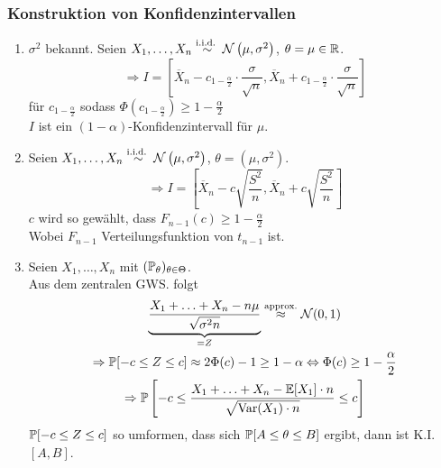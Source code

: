 \subsubsection*{Konstruktion von Konfidenzintervallen}%
\label{ssub:konstruktion_von_konfidenzintervallen}

\begin{enumerate}[label=Fall \arabic*:, align=left, leftmargin=*]
	\item $\sigma^2$ bekannt. Seien $X_1 , \ldots , X_n \overset{\text{i.i.d.\ }}{\sim} \mathcal{N} \left( \mu , \sigma^2 \right)$,
		$\theta = \mu \in \mathbb{R}$.
		\begin{equation*}
			\Longrightarrow I = \left[ \overline{X}_n - c_{1 - \frac{\alpha}{2} } \cdot \frac{\sigma}{\sqrt{n}} ,\overline{X}_n + c_{1 - \frac{\alpha}{2} } \cdot \frac{\sigma}{\sqrt{n}} \right]
		\end{equation*}
		für $c_{1 - \frac{\alpha}{2}}$ sodass $\Phi(c_{1 - \frac{\alpha}{2}}) \geq 1 - \frac{\alpha}{2} $\\
		$I$ ist ein $(1-\alpha)$-Konfidenzintervall für $\mu$.
	\item Seien $X_1 , \ldots , X_n \overset{\text{i.i.d.\ }}{\sim} \mathcal{N} \left( \mu , \sigma^2 \right)$, $\theta = \left(
		\mu, \sigma^2 \right)$.
		\begin{equation*}
			\Longrightarrow I = \left[ \overline{X}_n - c \sqrt{\frac{S^2}{n}} ,\overline{X}_n + c \sqrt{\frac{S^2}{n}} \right]
		\end{equation*}
		$c$ wird so gewählt, dass $F_{n-1}(c) \geq 1 - \frac{\alpha}{2}$\\
		Wobei $F_{n-1}$ Verteilungsfunktion von $t_{n-1}$ ist.
	\item Seien $X_1 , \ldots , X_n$ \iid mit $(\mathbb{P}_\theta)_{\theta \in \Theta}$.\\
		Aus dem zentralen GWS. folgt
		\begin{gather*}
			\underbrace{\frac{X_1 + \ldots + X_n - n \mu}{\sqrt{\sigma^2 n}} }_{= Z} \overset{\text{approx.}}{\approx}
			\mathcal{N}(0,1)\\
			\Rightarrow \mathbb{P}[-c \leq Z \leq c] \approx 2 \Phi(c) -1 \geq 1 -\alpha \Leftrightarrow \Phi (c) \geq 1 -
			\frac{\alpha}{2} \\
			\Rightarrow \mathbb{P} \left[ -c \leq \frac{X_1 + \ldots + X_n - \mathbb{E}[X_1] \cdot n}{\sqrt{\operatorname{Var}(X_1) \cdot n}} \leq c \right]
		\end{gather*}
		$\mathbb{P} [-c \leq Z \leq c]$ so umformen, dass sich $\mathbb{P}[A \leq \theta \leq B]$ ergibt, dann ist K.I. $[A,B]$.
\end{enumerate}


